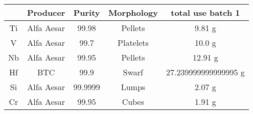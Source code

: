 \begin{tabular}{ccccc}
\toprule
{} &    Producer &   Purity & Morphology &     total use batch 1 \\
\midrule
Ti &  Alfa Aesar &    99.98 &    Pellets &                9.81 g \\
V  &  Alfa Aesar &     99.7 &  Platelets &                10.0 g \\
Nb &  Alfa Aesar &    99.95 &    Pellets &               12.91 g \\
Hf &         BTC &     99.9 &      Swarf &  27.239999999999995 g \\
Si &  Alfa Aesar &  99.9999 &      Lumps &                2.07 g \\
Cr &  Alfa Aesar &    99.95 &      Cubes &                1.91 g \\
\bottomrule
\end{tabular}
